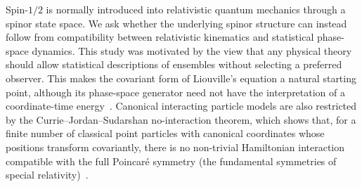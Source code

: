 \documentclass[final,5p,times,twocolumn]{elsarticle}
\begin{document}
Spin-$1/2$ is normally introduced into relativistic quantum mechanics through a spinor state space. 
We ask whether the underlying spinor structure can instead follow from compatibility between relativistic kinematics and statistical phase-space dynamics. 
This study was motivated by the view that any physical theory should allow statistical descriptions of ensembles without selecting a preferred observer.
This makes the covariant form of Liouville's equation a natural starting point, although its phase-space generator need not have the interpretation
of a coordinate-time energy~\cite{hakim2011introduction}. 
Canonical interacting particle models are also restricted by the Currie--Jordan--Sudarshan no-interaction theorem, which shows that, for a finite number of classical point particles with canonical coordinates whose positions transform covariantly, there is no non-trivial Hamiltonian interaction compatible with the full Poincar\'e symmetry (the fundamental symmetries of special relativity)~\cite{RevModPhys.35.350}. 
\end{document}
